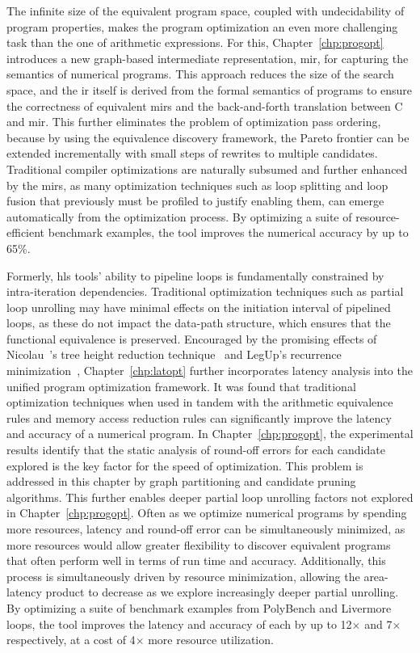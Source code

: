 The infinite size of the equivalent program space, coupled with undecidability
of program properties, makes the program optimization an even more
challenging task than the one of arithmetic expressions.  For this,
Chapter~\ref{chp:progopt} introduces a new graph-based intermediate
representation, \gls{mir}, for capturing the semantics of numerical programs.
This approach reduces the size of the search space, and the \gls{ir} itself
is derived from the formal semantics of programs to ensure the correctness
of equivalent \glspl{mir} and the back-and-forth translation between C and
\gls{mir}\@.  This further eliminates the problem of optimization pass
ordering, because by using the equivalence discovery framework, the Pareto
frontier can be extended incrementally with small steps of rewrites to multiple
candidates.  Traditional compiler optimizations are naturally subsumed and
further enhanced by the \glspl{mir}, as many optimization techniques such as
loop splitting and loop fusion that previously must be profiled to justify
enabling them, can emerge automatically from the optimization process.  By
optimizing a suite of resource-efficient benchmark examples, the tool improves
the numerical accuracy by up to 65\%.

Formerly, \gls{hls} tools' ability to pipeline loops is fundamentally
constrained by intra-iteration dependencies.  Traditional optimization
techniques such as partial loop unrolling may have minimal effects on the
initiation interval of pipelined loops, as these do not impact the data-path
structure, which ensures that the functional equivalence is preserved.
Encouraged by the promising effects of Nicolau~\etal's tree height reduction
technique~\cite{nicolau91} and LegUp's recurrence minimization~\cite{canis14},
Chapter~\ref{chp:latopt} further incorporates latency analysis into the unified
program optimization framework.  It was found that traditional optimization
techniques when used in tandem with the arithmetic equivalence rules and memory
access reduction rules can significantly improve the latency and accuracy of
a numerical program.  In Chapter~\ref{chp:progopt}, the experimental results
identify that the static analysis of round-off errors for each candidate
explored is the key factor for the speed of optimization.  This problem
is addressed in this chapter by graph partitioning and candidate pruning
algorithms.  This further enables deeper partial loop unrolling factors not
explored in Chapter~\ref{chp:progopt}.  Often as we optimize numerical programs
by spending more resources, latency and round-off error can be simultaneously
minimized, as more resources would allow greater flexibility to discover
equivalent programs that often perform well in terms of run time and accuracy.
Additionally, this process is simultaneously driven by resource minimization,
allowing the area-latency product to decrease as we explore increasingly deeper
partial unrolling.  By optimizing a suite of benchmark examples from PolyBench
and Livermore loops, the tool improves the latency and accuracy of each by up
to 12$\times$ and 7$\times$ respectively, at a cost of 4$\times$ more resource
utilization.


